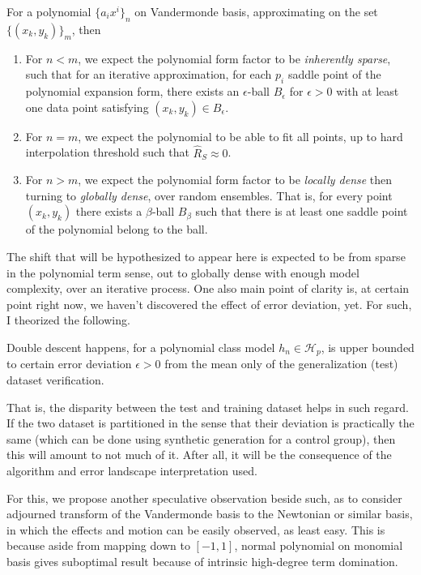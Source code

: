 \begin{hypothesis}
For a polynomial $\{a_{i}x^{i}\}_{n}$ on Vandermonde basis, approximating on the set $\{(x_{k},y_{k})\}_{m}$, then
\begin{enumerate}[topsep=1.5pt,itemsep=1pt]
  \item For $n<m$, we expect the polynomial form factor to be \textit{inherently sparse}, such that for an iterative approximation, for each $p_{i}$ saddle point of the polynomial expansion form, there exists an $\epsilon$-ball $B_{\epsilon}$ for $\epsilon>0$ with at least one data point satisfying $(x_{k},y_{k})\in B_{\epsilon}$. 
  \item For $n=m$, we expect the polynomial to be able to fit all points, up to hard interpolation threshold such that $\hat{R}_{S}\approx 0$. 
  \item For $n>m$, we expect the polynomial form factor to be \textit{locally dense} then turning to \textit{globally dense}, over random ensembles. That is, for every point $(x_{k},y_{k})$ there exists a $\beta$-ball $B_{\beta}$ such that there is at least one saddle point of the polynomial belong to the ball. 
\end{enumerate}
\end{hypothesis}

The shift that will be hypothesized to appear here is expected to be from sparse in the polynomial term sense, out to globally dense with enough model complexity, over an iterative process. One also main point of clarity is, at certain point right now, we haven't discovered the effect of error deviation, yet. For such, I theorized the following. 

\begin{conjecture}
  Double descent happens, for a polynomial class model $h_{n}\in\mathcal{H}_{p}$, is upper bounded to certain error deviation $\epsilon>0$ from the mean only of the generalization (test) dataset verification. 
\end{conjecture}

That is, the disparity between the test and training dataset helps in such regard. If the two dataset is partitioned in the sense that their deviation is practically the same (which can be done using synthetic generation for a control group), then this will amount to not much of it. After all, it will be the consequence of the algorithm and error landscape interpretation used. 

For this, we propose another speculative observation beside such, as to consider adjourned transform of the Vandermonde basis to the Newtonian or similar basis, in which the effects and motion can be easily observed, as least easy. This is because aside from mapping down to $[-1,1]$, normal polynomial on monomial basis gives suboptimal result because of intrinsic high-degree term domination. 

